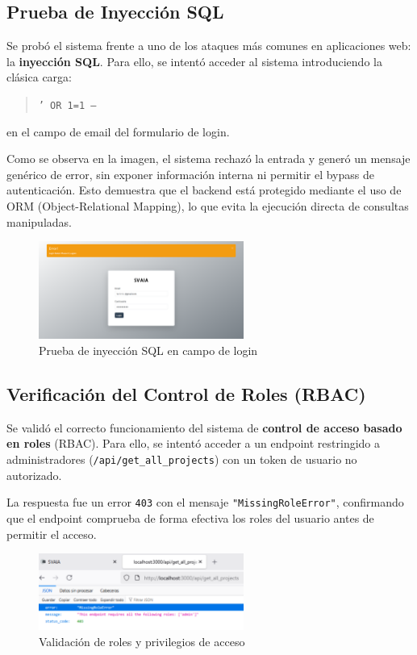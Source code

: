\documentclass[11pt]{article}
\begin{document}
\subsection{Prueba de Inyección SQL}

Se probó el sistema frente a uno de los ataques más comunes en aplicaciones web: la \textbf{inyección SQL}. Para ello, se intentó acceder al sistema introduciendo la clásica carga:

\begin{quote}
\texttt{' OR 1=1 --}
\end{quote}

en el campo de email del formulario de login.

Como se observa en la imagen, el sistema rechazó la entrada y generó un mensaje genérico de error, sin exponer información interna ni permitir el bypass de autenticación. Esto demuestra que el backend está protegido mediante el uso de ORM (Object-Relational Mapping), lo que evita la ejecución directa de consultas manipuladas.

\begin{figure}[H]
    \centering
    \includegraphics[width=0.6\textwidth]{images/sql_injection_test.png}
    \caption{Prueba de inyección SQL en campo de login}
\end{figure}

\subsection{Verificación del Control de Roles (RBAC)}

Se validó el correcto funcionamiento del sistema de \textbf{control de acceso basado en roles} (RBAC). Para ello, se intentó acceder a un endpoint restringido a administradores (\texttt{/api/get\_all\_projects}) con un token de usuario no autorizado.

La respuesta fue un error \texttt{403} con el mensaje \texttt{"MissingRoleError"}, confirmando que el endpoint comprueba de forma efectiva los roles del usuario antes de permitir el acceso.

\begin{figure}[H]
    \centering
    \includegraphics[width=0.6\textwidth]{images/rbac_test.png}
    \caption{Validación de roles y privilegios de acceso}
\end{figure}
\end{document}
